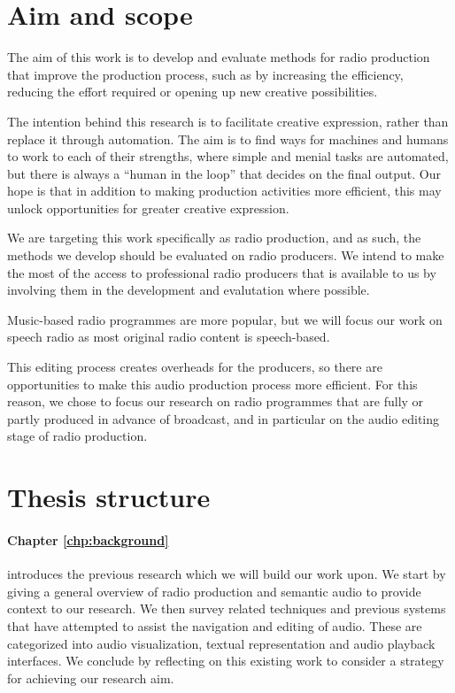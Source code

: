 \section{Aim and scope}

The aim of this work is to develop and evaluate methods for radio production that improve the production process, such
as by increasing the efficiency, reducing the effort required or opening up new creative possibilities.

The intention behind this research is to facilitate creative expression, rather than replace it through automation.
The aim is to find ways for machines and humans to work to each of their strengths, where simple and menial tasks are
automated, but there is always a ``human in the loop'' that decides on the final output.  Our hope is that in addition
to making production activities more efficient, this may unlock opportunities for greater creative expression.

We are targeting this work specifically as radio production, and as such, the methods we develop should be evaluated on
radio producers. We intend to make the most of the access to professional radio producers that is available to us by
involving them in the development and evalutation where possible.

Music-based radio programmes are more popular, but we will focus our work on speech radio as most original radio
content is speech-based.

This editing process creates overheads for the producers, so there are opportunities to make this audio production
process more efficient.  For this reason, we chose to focus our research on radio programmes that are fully or partly
produced in advance of broadcast, and in particular on the audio editing stage of radio production.

\section{Thesis structure}\label{sec:intro/structure}

\paragraph{Chapter \ref{chp:background}} introduces the previous research which we will build our work upon. We start
by giving a general overview of radio production and semantic audio to provide context to our research. We then survey
related techniques and previous systems that have attempted to assist the navigation and editing of audio. These are
categorized into audio visualization, textual representation and audio playback interfaces. We conclude by reflecting
on this existing work to consider a strategy for achieving our research aim.

